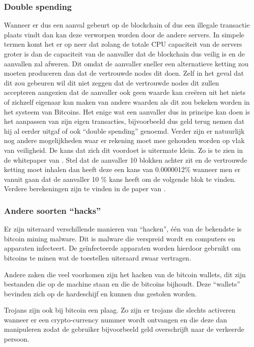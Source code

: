 \subsubsection{Double spending}
\label{sec:hoeveiligisblockchain}
Wanneer er dus een aanval gebeurt op de blockchain of dus een illegale transactie plaats vindt dan kan deze verworpen worden door de andere servers. In simpele termen komt het er op neer dat zolang de totale CPU capaciteit van de servers groter is dan de capaciteit van de aanvaller dat de blockchain dus veilig is en de aanvallen zal afweren. Dit omdat de aanvaller sneller een alternatieve ketting zou moeten produceren  dan dat de vertrouwde nodes dit doen. Zelf in het geval dat dit zou gebeuren wil dit niet zeggen dat de vertrouwde nodes dit zullen accepteren aangezien dat de aanvaller ook geen waarde kan creëren uit het niets of zichzelf eigenaar kan maken van andere waarden als dit zou bekeken worden in het systeem van Bitcoins. Het enige wat een aanvaller dus in principe kan doen is het aanpassen van zijn eigen transacties, bijvoorbeeld dus geld terug nemen dat hij al eerder uitgaf of ook ``double spending'' genoemd. Verder zijn er natuurlijk nog andere mogelijkheden waar er rekening moet mee gehouden worden op vlak van veiligheid. De kans dat zich dit voordoet is uitermate klein. Zo is te zien in de whitepaper van \textcite{Nakamoto2008}. Stel dat de aanvaller 10 blokken achter zit en de vertrouwde ketting moet inhalen dan heeft deze een kans van 0.0000012\% wanneer men er vanuit gaan dat de aanvaller 10 \% kans heeft om de volgende blok te vinden. Verdere berekeningen zijn te vinden in de paper van \autocite{Nakamoto2008}.

\subsubsection{Andere soorten ``hacks''}
Er zijn uiteraard verschillende manieren van ``hacken'', één van de bekendste is bitcoin mining malware. Dit is malware die verspreid wordt en computers en apparaten infecteert. De geïnfecteerde apparaten worden hierdoor gebruikt om bitcoins te minen wat de toestellen uiteraard zwaar vertragen. 

Andere zaken die veel voorkomen zijn het hacken van de bitcoin wallets, dit zijn bestanden die op de machine staan en die de bitcoins bijhoudt. Deze ``wallets'' bevinden zich op de hardeschijf en kunnen dus gestolen worden. 

Trojans zijn ook bij bitcoin een plaag. Zo zijn er trojans die slechts activeren wanneer er een crypto-currency nummer wordt ontvangen en die deze dan manipuleren zodat de gebruiker bijvoorbeeld geld overschrijft naar de verkeerde persoon. 

